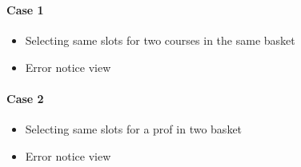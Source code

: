 \documentclass[letterpaper,10pt,english]{sphinxmanual}
\begin{document}


\subsubsection{}
\label{\detokenize{user_manual:id2}}

\paragraph{Case 1}
\label{\detokenize{user_manual:id3}}\begin{itemize}
\item {} 
Selecting same slots for two courses in the same basket

\end{itemize}

\begin{itemize}
\item {} 
Error notice view

\end{itemize}



\paragraph{Case 2}
\label{\detokenize{user_manual:id4}}\begin{itemize}
\item {} 
Selecting same slots for a prof in two basket

\end{itemize}

\begin{itemize}
\item {} 
Error notice view

\end{itemize}
\end{document}
